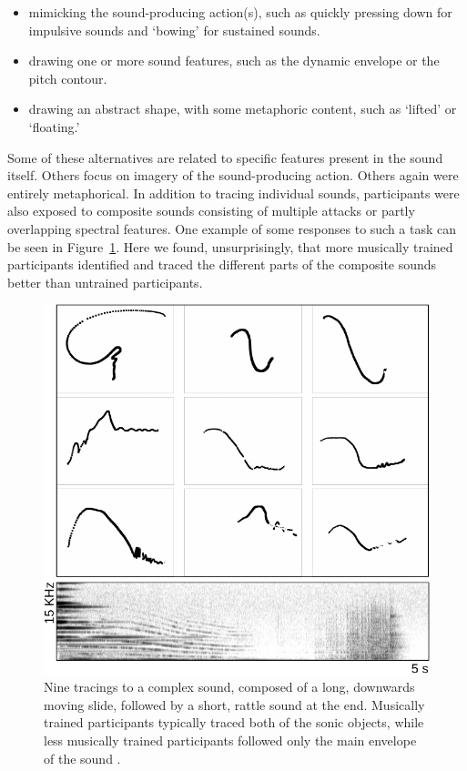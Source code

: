 \begin{itemize}
      \item mimicking the sound-producing action(s), such as quickly pressing down for impulsive sounds and `bowing' for sustained sounds.
      \item drawing one or more sound features, such as the dynamic envelope or the pitch contour.
      \item drawing an abstract shape, with some metaphoric content, such as `lifted' or `floating.'
\end{itemize}

Some of these alternatives are related to specific features present in the sound itself. Others focus on imagery of the sound-producing action. Others again were entirely metaphorical. In addition to tracing individual sounds, participants were also exposed to composite sounds consisting of multiple attacks or partly overlapping spectral features. One example of some responses to such a task can be seen in Figure~\ref{fig:sound-tracing}. Here we found, unsurprisingly, that more musically trained participants identified and traced the different parts of the composite sounds better than untrained participants.

\begin{figure}[tbp]
      \centering
      \includegraphics[width=\columnwidth]{figures/29-sound-tracing-crop.pdf}
      \caption{Nine tracings to a complex sound, composed of a long, downwards moving slide, followed by a short, rattle sound at the end. Musically trained participants typically traced both of the sonic objects, while less musically trained participants followed only the main envelope of the sound \citep{godoy_exploring_2006}.}
      \label{fig:sound-tracing}
\end{figure}

